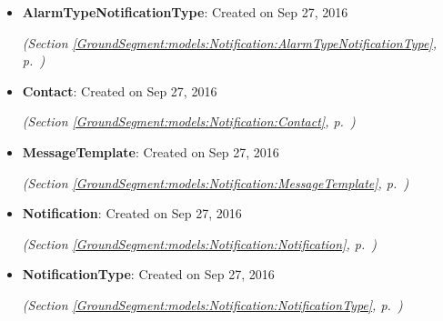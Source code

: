 \begin{itemize}
\setlength{\parskip}{0ex}
\item \textbf{AlarmTypeNotificationType}: Created on Sep 27, 2016



  \textit{(Section \ref{GroundSegment:models:Notification:AlarmTypeNotificationType}, p.~\pageref{GroundSegment:models:Notification:AlarmTypeNotificationType})}

\item \textbf{Contact}: Created on Sep 27, 2016



  \textit{(Section \ref{GroundSegment:models:Notification:Contact}, p.~\pageref{GroundSegment:models:Notification:Contact})}

\item \textbf{MessageTemplate}: Created on Sep 27, 2016



  \textit{(Section \ref{GroundSegment:models:Notification:MessageTemplate}, p.~\pageref{GroundSegment:models:Notification:MessageTemplate})}

\item \textbf{Notification}: Created on Sep 27, 2016



  \textit{(Section \ref{GroundSegment:models:Notification:Notification}, p.~\pageref{GroundSegment:models:Notification:Notification})}

\item \textbf{NotificationType}: Created on Sep 27, 2016



  \textit{(Section \ref{GroundSegment:models:Notification:NotificationType}, p.~\pageref{GroundSegment:models:Notification:NotificationType})}

\end{itemize}

